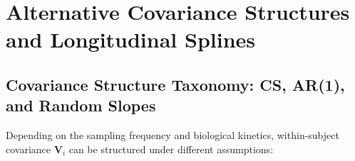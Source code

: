 \documentclass[11pt,twoside,openright]{book}
\begin{document}
\section{Alternative Covariance Structures and Longitudinal Splines}

\subsection{Covariance Structure Taxonomy: CS, AR(1), and Random Slopes}

Depending on the sampling frequency and biological kinetics, within-subject covariance $\mathbf{V}_i$ can be structured under different assumptions:
\end{document}
